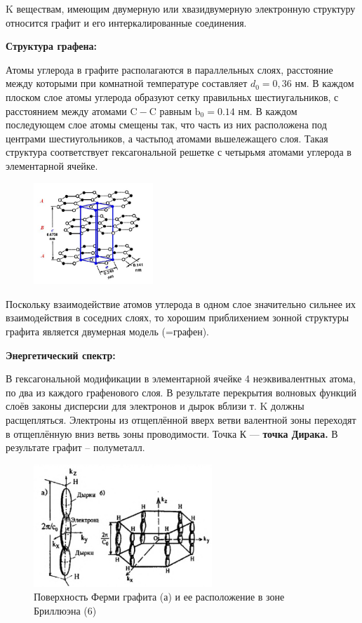 K веществам, имеющим двумерную или хвазидвумерную электронную структуру относится графит и его интеркалированные соединения. 

\textbf{Структура графена:}

Атомы углерода в графите располагаются в параллельных слоях, расстояние между которыми при комнатной температуре составляет $d_0=0,36$ нм. В каждом плоском слое атомы углерода образуют сетку правильньх шестиугальников, с расстоянием между атомами $\mathrm{C}-\mathrm{C}$ равным $\mathrm{b}_0=0.14$ нм. В каждом последующем слое атомы смещены так, что часть из них расположена под центрами шестиугольников, а частьпод атомами вьшележащего слоя. Такая структура соответствует гексагональной решетке с четырьмя атомами углерода в элементарной ячейке.
\begin{figure}[h!]
\centering
 \includegraphics[width=0.4\textwidth]{images/ph31.1.jpg}
\end{figure}

Поскольку взаимодействие атомов утлерода в одном слое значительно сильнее их взаимодействия в соседних слоях, то хорошим приблихением зонной структуры графита является двумерная модель (=графен). 

\textbf{Энергетический спектр:}

В гексагональной модификации в элементарной ячейке 4 неэквивалентных
атома, по два из каждого графенового слоя. В результате перекрытия
волновых функций слоёв законы дисперсии для электронов и дырок
вблизи т. K должны расщепляться. Электроны из отщеплённой вверх ветви
валентной зоны переходят в отщеплённую вниз ветвь зоны проводимости. Точка К --- \textbf{точка Дирака.}
В результате графит – полуметалл.
\begin{figure}[h!]
\centering
 \includegraphics[width=0.6\textwidth]{images/ph31.2.jpg}
 \caption*{Поверхность Ферми графита (а) и ее расположение в зоне Бриллюэна (6)}
\end{figure}


